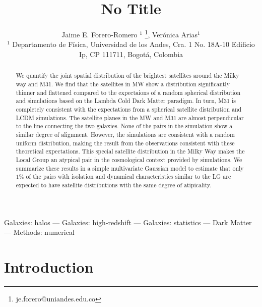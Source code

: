 \documentclass[a4paper,fleqn,usenatbib]{mnras}
\begin{document}
\title[No Title]{No Title}
\author[J.E. Forero-Romero \& V. Arias]
{Jaime E. Forero-Romero $^{1}$ \thanks{je.forero@uniandes.edu.co},
Ver\'onica Arias$^1$\\
$^1$ Departamento de F\'isica, Universidad de los Andes, Cra. 1
  No. 18A-10 Edificio Ip, CP 111711, Bogot\'a, Colombia \\
}

\maketitle

\begin{abstract}
We quantify the joint spatial distribution of the brightest satellites
around the Milky way and M31. 
We find that the satellites in MW show a distribution significantly
thinner and flattened compared to the expectaions of a random
spherical distribution and simulations based on the Lambda Cold Dark
Matter paradigm.
In turn, M31 is completely consistent with the expectations from a
spherical satellite distribution and LCDM simulations.
The satellite planes in the MW and M31 are almost perpendicular to the line
connecting the two galaxies. None of the pairs in the simulation show
a similar degree of alignment. 
However, the simulations are consistent with a random uniform
distribution, making the result from the observations consistent with
these theoretical expectations.
This special satellite distribution in the Milky Way makes the Local
Group an atypical pair in the cosmological context provided by
simulations. 
We summarize these results in a simple multivariate Gaussian
model to estimate that only $1\%$ of the pairs with isolation
and dynamical characteristics similar to the LG are expected to have
satellite distributions with the same degree of atipicality. 
\end{abstract}

\begin{keywords}Galaxies: halos --- Galaxies: high-redshift --- Galaxies: statistics
--- Dark Matter --- Methods: numerical 
\end{keywords}

\section{Introduction}
\end{document}

